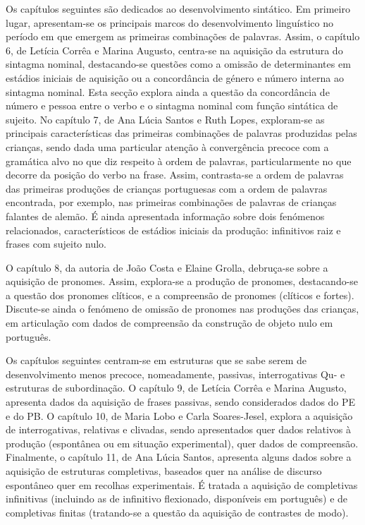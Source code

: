 \begin{refsection}
Os capítulos seguintes são dedicados ao desenvolvimento sintático. Em primeiro lugar, apresentam-se os principais marcos do desenvolvimento linguístico no período em que emergem as primeiras combinações de palavras. Assim, o capítulo 6, de Letícia Corrêa e Marina Augusto, centra-se na aquisição da estrutura do sintagma nominal, destacando-se questões como a omissão de determinantes em estádios iniciais de aquisição ou a concordância de género e número interna ao sintagma nominal. Esta secção explora ainda a questão da concordância de número e pessoa entre o verbo e o sintagma nominal com função sintática de sujeito. No capítulo 7, de Ana Lúcia Santos e Ruth Lopes, exploram-se as principais características das primeiras combinações de palavras produzidas pelas crianças, sendo dada uma particular atenção à convergência precoce com a gramática alvo no que diz respeito à ordem de palavras, particularmente no que decorre da posição do verbo na frase. Assim, contrasta-se a ordem de palavras das primeiras produções de crianças portuguesas com a ordem de palavras encontrada, por exemplo, nas primeiras combinações de palavras de crianças falantes de alemão. É ainda apresentada informação sobre dois fenómenos relacionados, característicos de estádios iniciais da produção: infinitivos raiz e frases com sujeito nulo.

O capítulo 8, da autoria de João Costa e Elaine Grolla, debruça-se sobre a aquisição de pronomes. Assim, explora-se a produção de pronomes, destacando-se a questão dos pronomes clíticos, e a compreensão de pronomes (clíticos e fortes). Discute-se ainda o fenómeno de omissão de pronomes nas produções das crianças, em articulação com dados de compreensão da construção de objeto nulo em português.

Os capítulos seguintes centram-se em estruturas que se sabe serem de desenvolvimento menos precoce, nomeadamente, passivas, interrogativas Qu- e estruturas de subordinação. O capítulo 9, de Letícia Corrêa e Marina Augusto, apresenta dados da aquisição de frases passivas, sendo considerados dados do PE e do PB. O capítulo 10, de Maria Lobo e Carla Soares-Jesel, explora a aquisição de interrogativas, relativas e clivadas, sendo apresentados quer dados relativos à produção (espontânea ou em situação experimental), quer dados de compreensão. Finalmente, o capítulo 11, de Ana Lúcia Santos, apresenta alguns dados sobre a aquisição de estruturas completivas, baseados quer na análise de discurso espontâneo quer em recolhas experimentais. É tratada a aquisição de completivas infinitivas (incluindo as de infinitivo flexionado, disponíveis em português) e de completivas finitas (tratando-se a questão da aquisição de contrastes de modo). 


\end{refsection}
